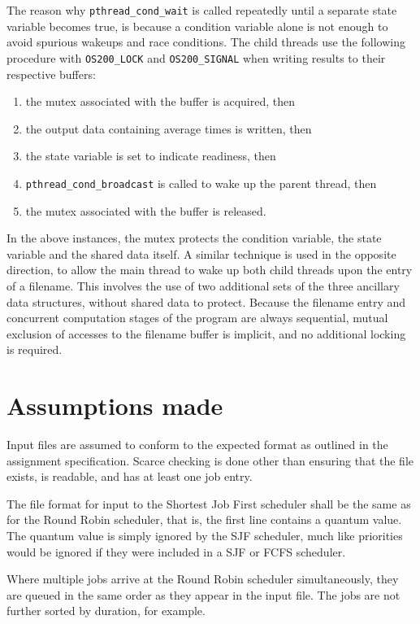 \documentclass[a4paper,12pt,titlepage]{article}
\begin{document}
The reason why \texttt{pthread\_cond\_wait} is called repeatedly until a
separate state variable becomes true, is because a condition variable alone is
not enough to avoid spurious wakeups and race conditions. The child threads use
the following procedure with \texttt{OS200\_LOCK} and \texttt{OS200\_SIGNAL}
when writing results to their respective buffers:

\begin{enumerate}
	\item the mutex associated with the buffer is acquired, then
	\item the output data containing average times is written, then
	\item the state variable is set to indicate readiness, then
	\item \texttt{pthread\_cond\_broadcast} is called to wake up the
	      parent thread, then
	\item the mutex associated with the buffer is released.
\end{enumerate}

In the above instances, the mutex protects the condition variable, the state
variable and the shared data itself. A similar technique is used in the
opposite direction, to allow the main thread to wake up both child threads
upon the entry of a filename. This involves the use of two additional sets of
the three ancillary data structures, without shared data to protect. Because
the filename entry and concurrent computation stages of the program are always
sequential, mutual exclusion of accesses to the filename buffer is implicit,
and no additional locking is required.

\newpage

\section{Assumptions made}

Input files are assumed to conform to the expected format as outlined in the
assignment specification. Scarce checking is done other than ensuring that the
file exists, is readable, and has at least one job entry.

The file format for input to the Shortest Job First scheduler shall be the same
as for the Round Robin scheduler, that is, the first line contains a quantum
value. The quantum value is simply ignored by the SJF scheduler, much like
priorities would be ignored if they were included in a SJF or FCFS scheduler.

Where multiple jobs arrive at the Round Robin scheduler simultaneously, they
are queued in the same order as they appear in the input file. The jobs are not
further sorted by duration, for example.
\end{document}
